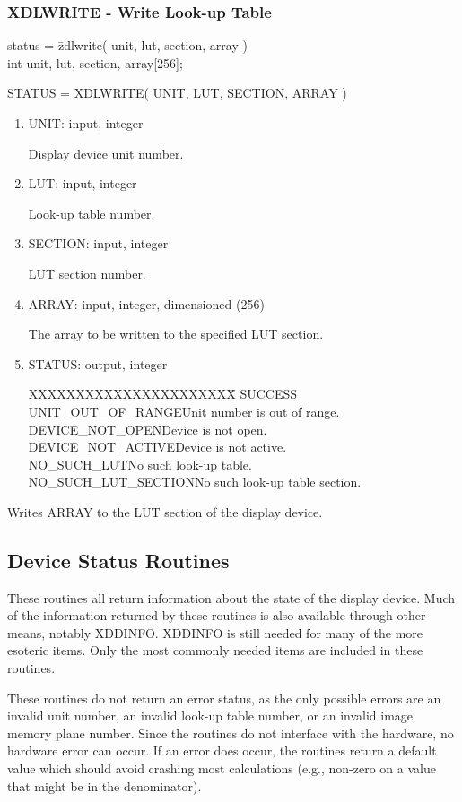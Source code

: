 \subsubsection{XDLWRITE - Write Look-up Table}
\begin{tabbing}
status = \=zdlwrite( unit, lut, section, array )\\
\>int  unit, lut, section, array[256];\\
\end{tabbing}
STATUS = XDLWRITE( UNIT, LUT, SECTION, ARRAY )
\begin{enumerate}
\item UNIT:  input, integer

Display device unit number.
\item LUT:  input, integer

Look-up table number.
\item SECTION:  input, integer

LUT section number.
\item ARRAY:  input, integer, dimensioned (256)

The array to be written to the specified LUT section.
\item STATUS:  output, integer
\begin{tabbing}
XXXXXXXXXXXXXXXXXXXXXX\=\kill
SUCCESS\\
UNIT\_OUT\_OF\_RANGE\>Unit number is out of range.\\
DEVICE\_NOT\_OPEN\>Device is not open.\\
DEVICE\_NOT\_ACTIVE\>Device is not active.\\
NO\_SUCH\_LUT\>No such look-up table.\\
NO\_SUCH\_LUT\_SECTION\>No such look-up table section.\\
\end{tabbing}
\end{enumerate}
Writes ARRAY to the LUT section of the display device.
\newpage
\subsection{Device Status Routines}
These routines all return information about the state of the display device.
Much of the information returned by these routines is also available through
other means, notably XDDINFO.  XDDINFO is still needed for many of the more
esoteric items.  Only the most commonly needed items are included in these
routines.

These routines do not return an error status, as the only possible errors
are an invalid unit number, an invalid look-up table number, or an invalid
image memory plane number.  Since the routines do not interface with the
hardware, no hardware error can occur.  If an error does occur, the
routines return a default value which should avoid crashing most calculations
(e.g., non-zero on a value that might be in the denominator).
\newpage
